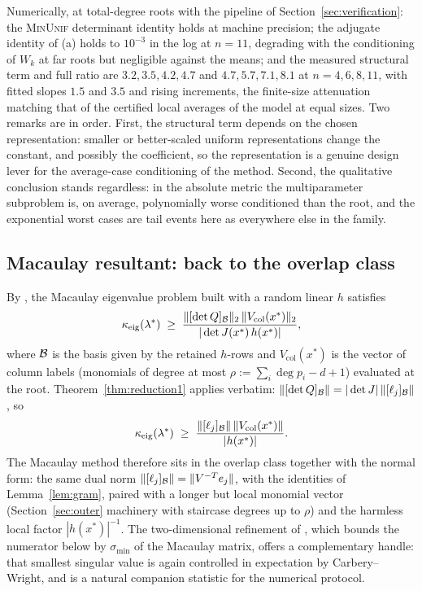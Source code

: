 Numerically, at total-degree roots with the pipeline of
Section~\ref{sec:verification}: the \textsc{MinUnif} determinant identity holds at machine
precision; the adjugate identity of (a) holds to $10^{-3}$ in the log at $n=11$, degrading
with the conditioning of $W_k$ at far roots but negligible against the means; and the
measured structural term and full ratio are $3.2, 3.5, 4.2, 4.7$ and $4.7, 5.7, 7.1, 8.1$
at $n=4,6,8,11$, with fitted slopes $1.5$ and $3.5$ and rising increments, the finite-size
attenuation matching that of the certified local averages of the model at equal sizes.
Two remarks are in order. First, the structural term depends on the chosen representation:
smaller or better-scaled uniform representations change the constant, and possibly the
coefficient, so the representation is a genuine design lever for the average-case
conditioning of the method. Second, the qualitative conclusion stands regardless: in the
absolute metric the multiparameter subproblem is, on average, polynomially worse
conditioned than the root, and the exponential worst cases are tail events here as
everywhere else in the family.

\subsection{Macaulay resultant: back to the overlap class}\label{sec:macaulay}

By \cite[Thm.~7.1]{graf2026numerical}, the Macaulay eigenvalue problem built with a random
linear $h$ satisfies
\[
  \kappa_{\mathrm{eig}}(\lambda^*) \;\ge\;
  \frac{\|[\det Q]_{\mathcal{B}}\|_2\,\|V_{\mathrm{col}}(x^*)\|_2}{|\det J(x^*)\,h(x^*)|},
\]
where $\mathcal{B}$ is the basis given by the retained $h$-rows and $V_{\mathrm{col}}(x^*)$ is the
vector of column labels (monomials of degree at most $\rho := \sum_i\deg p_i - d + 1$)
evaluated at the root. Theorem~\ref{thm:reduction1} applies verbatim:
$\|[\det Q]_{\mathcal{B}}\| = |\det J|\,\|[\ell_j]_{\mathcal{B}}\|$, so
\[
  \kappa_{\mathrm{eig}}(\lambda^*) \;\ge\;
  \frac{\|[\ell_j]_{\mathcal{B}}\|\,\|V_{\mathrm{col}}(x^*)\|}{|h(x^*)|}.
\]
The Macaulay method therefore sits in the overlap class together with the normal form: the
same dual norm $\|[\ell_j]_{\mathcal{B}}\| = \|V^{-T}e_j\|$, with the identities of
Lemma~\ref{lem:gram}, paired with a longer but local monomial vector
(Section~\ref{sec:outer} machinery with staircase degrees up to $\rho$) and the harmless
local factor $|h(x^*)|^{-1}$. The two-dimensional refinement of
\cite[Sec.~8]{graf2026numerical}, which bounds the numerator below by $\sigma_{\min}$ of
the Macaulay matrix, offers a complementary handle: that smallest singular value is again
controlled in expectation by Carbery--Wright, and is a natural companion statistic for the
numerical protocol.


